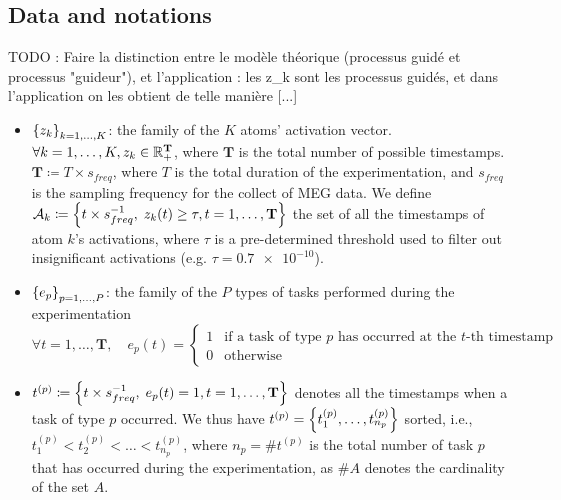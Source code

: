 \subsection{Data and notations}

TODO : Faire la distinction entre le modèle théorique (processus guidé et processus "guideur"), et l'application : les z\_k sont les processus guidés, et dans l'application on les obtient de telle manière [...] 

\begin{itemize}
    \item $\left\lbrace z_k \right\rbrace_{k=1,\dots,K}$: the family of the $K$ atoms' activation vector.
    $\forall k=1,\dots,K, z_k\in\mathbb{R}_+^\mathbf{T}$, where $\mathbf{T}$ is the total number of possible timestamps.
    $\mathbf{T} \coloneqq T \times s_{freq}$, where $T$ is the total duration of the experimentation, and $s_{freq}$ is the sampling frequency for the collect of MEG data.
    We define $\mathcal{A}_k \coloneqq \left\lbrace t\times s_{freq}^{-1},\; z_k(t)\geq\tau, t=1,\dots, \mathbf{T} \right\rbrace$ the set of all the timestamps of atom $k$'s activations, where $\tau$ is a pre-determined threshold used to filter out insignificant activations (e.g. $\tau = \num{0.7e-10}$).
    
    \item $\left\lbrace e_p \right\rbrace_{p=1,\dots,P}$: the family of the $P$ types of tasks performed during the experimentation
    \begin{equation*}
        \forall t=1,\dots,\mathbf{T}, \quad e_p(t)=
        \left\{
		\begin{array}{ll}
			1 & \mbox{if a task of type $p$ has occurred at the $t$-th timestamp}\\
			0 & \mbox{otherwise}
		\end{array}
	\right.
    \end{equation*}
    
    \item $t^{(p)} \coloneqq \left\lbrace t\times s_{freq}^{-1},\; e_p(t)=1, t=1,\dots, \mathbf{T} \right\rbrace$ denotes all the timestamps when a task of type $p$ occurred.
    We thus have $t^{(p)} = \left\lbrace t^{(p)}_1, \dots, t^{(p)}_{n_p} \right\rbrace$ sorted, i.e., $t^{(p)}_1 < t^{(p)}_2 < \dots < t^{(p)}_{n_p}$, where $n_p=\# t^{(p)}$ is the total number of task $p$ that has occurred during the experimentation, as $\# A$ denotes the cardinality of the set $A$.
\end{itemize} 